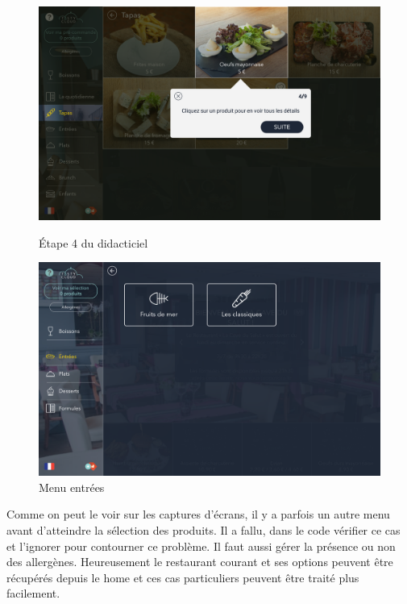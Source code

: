 \begin{figure}[!htb]
  \centering
  \begin{minipage}[b]{0.45\textwidth}
    \includegraphics[width=\textwidth]{images/tutoriel_screen2.png}
    \caption{Étape 4 du didacticiel}
  \end{minipage}
  \hfill
  \begin{minipage}[b]{0.45\textwidth}
    \includegraphics[width=\textwidth]{images/tutoriel_screen1.png}
    \caption{Menu entrées}
  \end{minipage}
\end{figure}

Comme on peut le voir sur les captures d'écrans, il y a parfois un autre menu avant d'atteindre la sélection des produits. Il a fallu, dans le code vérifier ce cas et l'ignorer pour contourner ce problème. Il faut aussi gérer la présence ou non des allergènes. Heureusement le restaurant courant et ses options peuvent être récupérés depuis le home et ces cas particuliers peuvent être traité plus facilement.

